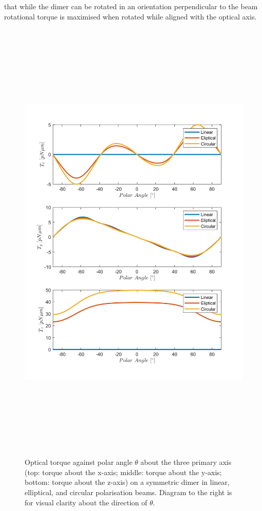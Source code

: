that while the dimer can be rotated in an orientation perpendicular 
to the beam rotational torque is maximised when rotated while aligned with 
the optical axis.
\begin{figure}
	\includegraphics[width=0.7\linewidth,height= 22cm]{torque_different_polarisations.png}
	\caption{Optical torque against polar angle $\theta$ about the three primary axis (top: torque about the x-axis; middle: torque about the y-axis; bottom: torque about the z-axis) on a symmetric dimer in linear, elliptical, and circular polarisation beams. Diagram to the right is for visual clarity about the direction of $\theta$. \vspace{7.5cm}}
\end{figure}
\newpage

